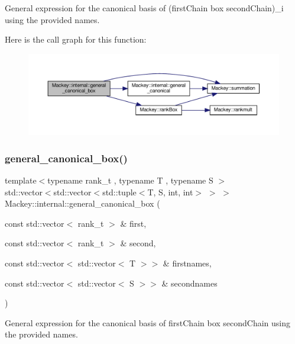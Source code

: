General expression for the canonical basis of (first\+Chain box second\+Chain)\+\_\+i using the provided names. 

Here is the call graph for this function\+:\nopagebreak
\begin{figure}[H]
\begin{center}
\leavevmode
\includegraphics[width=350pt]{namespaceMackey_1_1internal_a2c420c10c78dcc4f9ae579bad1cd2e45_cgraph}
\end{center}
\end{figure}
\mbox{\label{namespaceMackey_1_1internal_a780adcafc5fe040d6340557f88f052f2}} 
\subsubsection{\texorpdfstring{general\+\_\+canonical\+\_\+box()}{general\_canonical\_box()}\hspace{0.1cm}{\footnotesize\ttfamily [2/2]}}
{\footnotesize\ttfamily template$<$typename rank\+\_\+t , typename T , typename S $>$ \\
std\+::vector$<$std\+::vector$<$std\+::tuple$<$T, S, int, int$>$ $>$ $>$ Mackey\+::internal\+::general\+\_\+canonical\+\_\+box (\begin{DoxyParamCaption}\item[{const std\+::vector$<$ rank\+\_\+t $>$ \&}]{first,  }\item[{const std\+::vector$<$ rank\+\_\+t $>$ \&}]{second,  }\item[{const std\+::vector$<$ std\+::vector$<$ T $>$$>$ \&}]{firstnames,  }\item[{const std\+::vector$<$ std\+::vector$<$ S $>$$>$ \&}]{secondnames }\end{DoxyParamCaption})}



General expression for the canonical basis of first\+Chain box second\+Chain using the provided names. 

